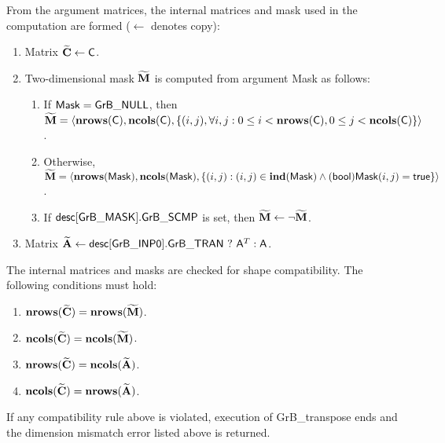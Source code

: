 From the argument matrices, the internal matrices and mask used in the computation are formed ($\leftarrow$ denotes copy):
\begin{enumerate}

	\item Matrix ${\bf \widetilde{C}} \leftarrow {\sf C}$.

	\item Two-dimensional mask ${\bf \widetilde{M}}$ is computed from argument 
    {\sf Mask} as follows:
	\begin{enumerate}

		\item	If ${\sf Mask} = {\sf GrB\_NULL}$, then ${\bf \widetilde{M}} = 
        \langle \bold{nrows}({\sf C}), \bold{ncols}({\sf C}), \{(i,j), 
        \forall i,j : 0 \leq i <  \bold{nrows}({\sf C}), 0 \leq j < \bold{ncols}({\sf C}) 
        \} \rangle$.

		\item	Otherwise, ${\bf \widetilde{M}} = \langle \bold{nrows}({\sf Mask}), 
        \bold{ncols}({\sf Mask}), \{(i,j) : (i,j) \in \bold{ind}({\sf Mask}) \wedge 
        ({\sf bool}){\sf Mask}(i,j) = {\sf true}\} \rangle$.

		\item	If ${\sf desc[GrB\_MASK].GrB\_SCMP}$ is set, then 
        ${\bf \widetilde{M}} \leftarrow \neg {\bf \widetilde{M}}$.

	\end{enumerate}

	\item Matrix ${\bf \widetilde{A}} \leftarrow {\sf desc[GrB\_INP0].GrB\_TRAN} \ ? \ {\sf A}^T : {\sf A}$.

\end{enumerate}

The internal matrices and masks are checked for shape compatibility. The following 
conditions must hold:
\begin{enumerate}
	\item $\bold{nrows}({\bf \widetilde{C}}) = \bold{nrows}({\bf \widetilde{M}})$.

	\item $\bold{ncols}({\bf \widetilde{C}}) = \bold{ncols}({\bf \widetilde{M}})$.

	\item $\bold{nrows}({\bf \widetilde{C}}) = \bold{ncols}({\bf \widetilde{A}})$.

	\item $\bold{ncols}({\bf \widetilde{C}}) = \bold{nrows}({\bf \widetilde{A}})$.
\end{enumerate}
If any compatibility rule above is violated, execution of {\sf GrB\_transpose} ends and 
the dimension mismatch error listed above is returned.

